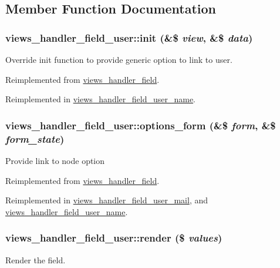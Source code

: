\subsection{Member Function Documentation}
\hypertarget{classviews__handler__field__user_a94156733dfddeb57dbd856e0f574cde6}{
\subsubsection[{init}]{\setlength{\rightskip}{0pt plus 5cm}views\_\-handler\_\-field\_\-user::init (\&\$ {\em view}, \/  \&\$ {\em data})}}
\label{classviews__handler__field__user_a94156733dfddeb57dbd856e0f574cde6}
Override init function to provide generic option to link to user. 

Reimplemented from \hyperlink{classviews__handler__field_a3a290c7df3ead81e5cd244ad5335b1cc}{views\_\-handler\_\-field}.

Reimplemented in \hyperlink{classviews__handler__field__user__name_a5879bbaa4a1e59f9509b9a5d6fbdd9b2}{views\_\-handler\_\-field\_\-user\_\-name}.\hypertarget{classviews__handler__field__user_aecf77682fa7dc9daf1fa97cbe045420d}{
\subsubsection[{options\_\-form}]{\setlength{\rightskip}{0pt plus 5cm}views\_\-handler\_\-field\_\-user::options\_\-form (\&\$ {\em form}, \/  \&\$ {\em form\_\-state})}}
\label{classviews__handler__field__user_aecf77682fa7dc9daf1fa97cbe045420d}
Provide link to node option 

Reimplemented from \hyperlink{classviews__handler__field_a0435d161922b7b4b84f02a2e79bb947a}{views\_\-handler\_\-field}.

Reimplemented in \hyperlink{classviews__handler__field__user__mail_aee55735f96178173853dbf1f8b293216}{views\_\-handler\_\-field\_\-user\_\-mail}, and \hyperlink{classviews__handler__field__user__name_a0c3b7db3d060e384287fa62f348c9387}{views\_\-handler\_\-field\_\-user\_\-name}.\hypertarget{classviews__handler__field__user_a145dcce889ee17821a1d9c65970d86f2}{
\subsubsection[{render}]{\setlength{\rightskip}{0pt plus 5cm}views\_\-handler\_\-field\_\-user::render (\$ {\em values})}}
\label{classviews__handler__field__user_a145dcce889ee17821a1d9c65970d86f2}
Render the field.



